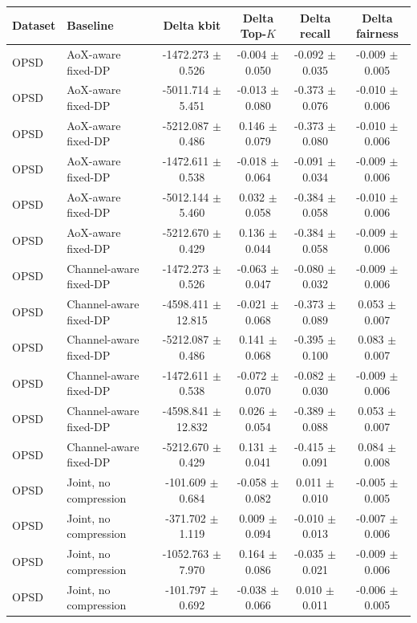 \begin{tabular}{llcccc}
\toprule
Dataset & Baseline & Delta kbit & Delta Top-$K$ & Delta recall & Delta fairness \\
\midrule
OPSD & AoX-aware fixed-DP & -1472.273 $\pm$ 0.526 & -0.004 $\pm$ 0.050 & -0.092 $\pm$ 0.035 & -0.009 $\pm$ 0.005 \\
OPSD & AoX-aware fixed-DP & -5011.714 $\pm$ 5.451 & -0.013 $\pm$ 0.080 & -0.373 $\pm$ 0.076 & -0.010 $\pm$ 0.006 \\
OPSD & AoX-aware fixed-DP & -5212.087 $\pm$ 0.486 & 0.146 $\pm$ 0.079 & -0.373 $\pm$ 0.080 & -0.010 $\pm$ 0.006 \\
OPSD & AoX-aware fixed-DP & -1472.611 $\pm$ 0.538 & -0.018 $\pm$ 0.064 & -0.091 $\pm$ 0.034 & -0.009 $\pm$ 0.006 \\
OPSD & AoX-aware fixed-DP & -5012.144 $\pm$ 5.460 & 0.032 $\pm$ 0.058 & -0.384 $\pm$ 0.058 & -0.010 $\pm$ 0.006 \\
OPSD & AoX-aware fixed-DP & -5212.670 $\pm$ 0.429 & 0.136 $\pm$ 0.044 & -0.384 $\pm$ 0.058 & -0.009 $\pm$ 0.006 \\
OPSD & Channel-aware fixed-DP & -1472.273 $\pm$ 0.526 & -0.063 $\pm$ 0.047 & -0.080 $\pm$ 0.032 & -0.009 $\pm$ 0.006 \\
OPSD & Channel-aware fixed-DP & -4598.411 $\pm$ 12.815 & -0.021 $\pm$ 0.068 & -0.373 $\pm$ 0.089 & 0.053 $\pm$ 0.007 \\
OPSD & Channel-aware fixed-DP & -5212.087 $\pm$ 0.486 & 0.141 $\pm$ 0.068 & -0.395 $\pm$ 0.100 & 0.083 $\pm$ 0.007 \\
OPSD & Channel-aware fixed-DP & -1472.611 $\pm$ 0.538 & -0.072 $\pm$ 0.070 & -0.082 $\pm$ 0.030 & -0.009 $\pm$ 0.006 \\
OPSD & Channel-aware fixed-DP & -4598.841 $\pm$ 12.832 & 0.026 $\pm$ 0.054 & -0.389 $\pm$ 0.088 & 0.053 $\pm$ 0.007 \\
OPSD & Channel-aware fixed-DP & -5212.670 $\pm$ 0.429 & 0.131 $\pm$ 0.041 & -0.415 $\pm$ 0.091 & 0.084 $\pm$ 0.008 \\
OPSD & Joint, no compression & -101.609 $\pm$ 0.684 & -0.058 $\pm$ 0.082 & 0.011 $\pm$ 0.010 & -0.005 $\pm$ 0.005 \\
OPSD & Joint, no compression & -371.702 $\pm$ 1.119 & 0.009 $\pm$ 0.094 & -0.010 $\pm$ 0.013 & -0.007 $\pm$ 0.006 \\
OPSD & Joint, no compression & -1052.763 $\pm$ 7.970 & 0.164 $\pm$ 0.086 & -0.035 $\pm$ 0.021 & -0.009 $\pm$ 0.006 \\
OPSD & Joint, no compression & -101.797 $\pm$ 0.692 & -0.038 $\pm$ 0.066 & 0.010 $\pm$ 0.011 & -0.006 $\pm$ 0.005 \\

\end{tabular}
